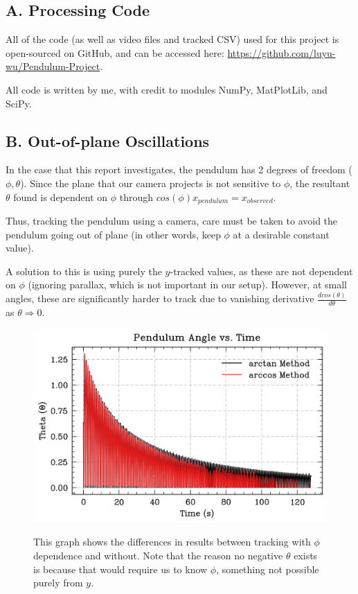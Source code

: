 \documentclass[prl,twocolumn,amsmath,amssymb,superscriptaddress]{revtex4-2}
\begin{document}
\subsection{A. Processing Code}

All of the code (as well as video files and tracked CSV) used for this project is open-sourced on GitHub, and can be accessed here: \href{https://github.com/luyu-wu/Pendulum-Project}{https://github.com/luyu-wu/Pendulum-Project}.

All code is written by me, with credit to modules NumPy, MatPlotLib, and SciPy.

\subsection{B. Out-of-plane Oscillations}

In the case that this report investigates, the pendulum has 2 degrees of freedom ($\phi, \theta$). Since the plane that our camera projects is not sensitive to $\phi$, the resultant $\theta$ found is dependent on $\phi$ through $cos(\phi)x_{pendulum} = x_{observed}$.

Thus, tracking the pendulum using a camera, care must be taken to avoid the pendulum going out of plane (in other words, keep $\phi$ at a desirable constant value).

A solution to this is using purely the $y$-tracked values, as these are not dependent on $\phi$ (ignoring parallax, which is not important in our setup).
However, at small angles, these are significantly harder to track due to vanishing derivative $\frac{dcos(\theta)}{d\theta}$ as $\theta \Rightarrow 0$.


\begin{figure}[htb]
    \includegraphics[width=0.4\linewidth]{out-of-plane.png}
    \label{fig:out-of-plane}
    \caption{This graph shows the differences in results between tracking with $\phi$ dependence and without. Note that the reason no negative $\theta$ exists is because that would require us to know $\phi$, something not possible purely from $y$.}
\end{figure}
\end{document}
